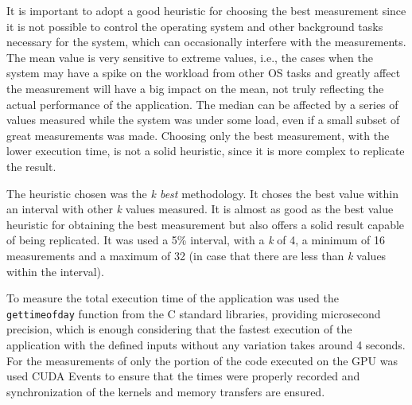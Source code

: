 It is important to adopt a good heuristic for choosing the best measurement since it is not possible to control the operating system and other background tasks necessary for the system, which can occasionally interfere with the measurements. The mean value is very sensitive to extreme values, i.e., the cases when the system may have a spike on the workload from other OS tasks and greatly affect the measurement will have a big impact on the mean, not truly reflecting the actual performance of the application. The median can be affected by a series of values measured while the system was under some load, even if a small subset of great measurements was made. Choosing only the best measurement, with the lower execution time, is not a solid heuristic, since it is more complex to replicate the result.

The heuristic chosen was the \textit{k best} methodology. It choses the best value within an interval with other \textit{k} values measured. It is almost as good as the best value heuristic for obtaining the best measurement but also offers a solid result capable of being replicated. It was used a 5\% interval, with a \textit{k} of 4, a minimum of 16 measurements and a maximum of 32 (in case that there are less than \textit{k} values within the interval).

To measure the total execution time of the application was used the \texttt{gettimeofday} function from the C standard libraries, providing microsecond precision, which is enough considering that the fastest execution of the application with the defined inputs without any variation takes around 4 seconds. For the measurements of only the portion of the code executed on the GPU was used CUDA Events to ensure that the times were properly recorded and synchronization of the kernels and memory transfers are ensured.

